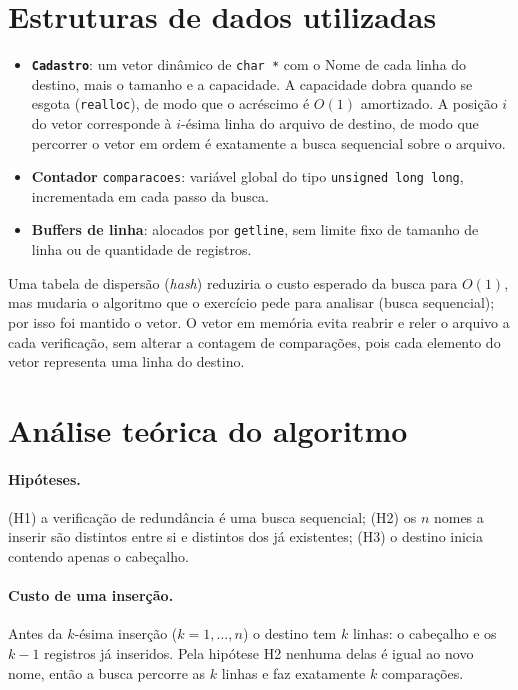 \documentclass[11pt,a4paper]{article}
\begin{document}
\section{Estruturas de dados utilizadas}

\begin{itemize}[nosep]
  \item \textbf{\texttt{Cadastro}}: um vetor dinâmico de \texttt{char *} com o
        Nome de cada linha do destino, mais o tamanho e a capacidade. A
        capacidade dobra quando se esgota (\texttt{realloc}), de modo que o
        acréscimo é $O(1)$ amortizado. A posição $i$ do vetor corresponde à
        $i$-ésima linha do arquivo de destino, de modo que percorrer o vetor
        em ordem é exatamente a busca sequencial sobre o arquivo.
  \item \textbf{Contador} \texttt{comparacoes}: variável global do tipo
        \texttt{unsigned long long}, incrementada em cada passo da busca.
  \item \textbf{Buffers de linha}: alocados por \texttt{getline}, sem limite fixo
        de tamanho de linha ou de quantidade de registros.
\end{itemize}

Uma tabela de dispersão (\emph{hash}) reduziria o custo esperado da busca para
$O(1)$, mas mudaria o algoritmo que o exercício pede para analisar (busca
sequencial); por isso foi mantido o vetor. O vetor em memória evita reabrir e
reler o arquivo a cada verificação, sem alterar a contagem de comparações, pois
cada elemento do vetor representa uma linha do destino.

\section{Análise teórica do algoritmo}
\label{sec:analise}

\paragraph{Hipóteses.} (H1) a verificação de redundância é uma busca sequencial;
(H2) os $n$ nomes a inserir são distintos entre si e distintos dos já existentes;
(H3) o destino inicia contendo apenas o cabeçalho.

\paragraph{Custo de uma inserção.} Antes da $k$-ésima inserção ($k=1,\dots,n$) o
destino tem $k$ linhas: o cabeçalho e os $k-1$ registros já inseridos. Pela
hipótese H2 nenhuma delas é igual ao novo nome, então a busca percorre as $k$
linhas e faz exatamente $k$ comparações.
\end{document}
